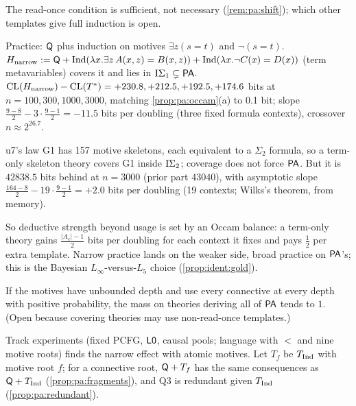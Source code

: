 \noindent The read-once condition is sufficient, not necessary (\cref{rem:pa:shift}); which other templates give full induction is open.

\begin{example}\pabrk{}\label{ex:pa:narrow}
Practice: $\mathsf{Q}$ plus induction on motives $\exists z(s=t)$ and $\neg(s=t)$. $H_{\mathrm{narrow}}:=\mathsf{Q}+\mathrm{Ind}(\lambda x.\exists z\,A(x,z)=B(x,z))+\mathrm{Ind}(\lambda x.\neg C(x)=D(x))$ (term metavariables) covers it and lies in $\mathrm{I}\Sigma_{1}\subsetneq\mathsf{PA}$. $\mathrm{CL}(H_{\mathrm{narrow}})-\mathrm{CL}(T^*)=+230.8,+212.5,+192.5,+174.6$ bits at $n=100,300,1000,3000$, matching \cref{prop:pa:occam}(a) to 0.1 bit; slope $\frac{9-8}2-3\cdot\frac{9-1}2=-11.5$ bits per doubling (three fixed formula contexts), crossover $n\approx2^{26.7}$.
\end{example}

\begin{example}[G1 keeps $\PA$]\pabrk{}\label{ex:pa:skel}
u7's law G1 has 157 motive skeletons, each equivalent to a $\Sigma_2$ formula, so a term-only skeleton theory covers G1 inside $\mathrm{I}\Sigma_{2}$; coverage does not force $\PA$. But it is $42838.5$ bits behind at $n=3000$ (prior part $43040$), with asymptotic slope $\frac{164-8}2-19\cdot\frac{9-1}2=+2.0$ bits per doubling (19 contexts; Wilks's theorem, from memory).
\end{example}

\noindent So deductive strength beyond usage is set by an Occam balance: a term-only theory gains $\frac{|A_c|-1}2$ bits per doubling for each context it fixes and pays $\frac12$ per extra template. Narrow practice lands on the weaker side, broad practice on $\PA$'s; this is the Bayesian $L_\infty$-versus-$L_5$ choice (\cref{prop:ident:gold}).

\begin{conjecture}\pabrk{}\label{conj:pa:broad}
If the motives have unbounded depth and use every connective at every depth with positive probability, the mass on theories deriving all of $\PA$ tends to $1$. (Open because covering theories may use non-read-once templates.)
\end{conjecture}

\noindent Track experiments (fixed PCFG, $\mathord{\mathsf{L0}}$, causal pools; language with $<$ and nine motive roots) finds the narrow effect with atomic motives. Let $T_f$ be $T_{\mathrm{Ind}}$ with motive root $f$; for a connective root, $\mathsf{Q}+T_f$ has the same consequences as $\mathsf{Q}+T_{\mathrm{Ind}}$ (\cref{prop:pa:fragments}), and Q3 is redundant given $T_{\mathrm{Ind}}$ (\cref{prop:pa:redundant}).

